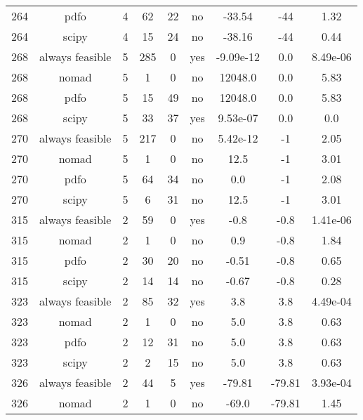 \begin{scriptsize}
\begin{center}
\begin{longtable}{ccccccccc}
264 &            pdfo &  4 &     62 &     22 &      no &      -33.54 &         -44 &     1.32\\
264 &           scipy &  4 &     15 &     24 &      no &      -38.16 &         -44 &     0.44\\
268 & always feasible &  5 &    285 &      0 &     yes &   -9.09e-12 &         0.0 & 8.49e-06\\
268 &           nomad &  5 &      1 &      0 &      no &     12048.0 &         0.0 &     5.83\\
268 &            pdfo &  5 &     15 &     49 &      no &     12048.0 &         0.0 &     5.83\\
268 &           scipy &  5 &     33 &     37 &     yes &    9.53e-07 &         0.0 &      0.0\\
270 & always feasible &  5 &    217 &      0 &      no &    5.42e-12 &          -1 &     2.05\\
270 &           nomad &  5 &      1 &      0 &      no &        12.5 &          -1 &     3.01\\
270 &            pdfo &  5 &     64 &     34 &      no &         0.0 &          -1 &     2.08\\
270 &           scipy &  5 &      6 &     31 &      no &        12.5 &          -1 &     3.01\\
315 & always feasible &  2 &     59 &      0 &     yes &        -0.8 &        -0.8 & 1.41e-06\\
315 &           nomad &  2 &      1 &      0 &      no &         0.9 &        -0.8 &     1.84\\
315 &            pdfo &  2 &     30 &     20 &      no &       -0.51 &        -0.8 &     0.65\\
315 &           scipy &  2 &     14 &     14 &      no &       -0.67 &        -0.8 &     0.28\\
323 & always feasible &  2 &     85 &     32 &     yes &         3.8 &         3.8 & 4.49e-04\\
323 &           nomad &  2 &      1 &      0 &      no &         5.0 &         3.8 &     0.63\\
323 &            pdfo &  2 &     12 &     31 &      no &         5.0 &         3.8 &     0.63\\
323 &           scipy &  2 &      2 &     15 &      no &         5.0 &         3.8 &     0.63\\
326 & always feasible &  2 &     44 &      5 &     yes &      -79.81 &      -79.81 & 3.93e-04\\
326 &           nomad &  2 &      1 &      0 &      no &       -69.0 &      -79.81 &     1.45\\

\end{longtable}
\end{center}
\end{scriptsize}
